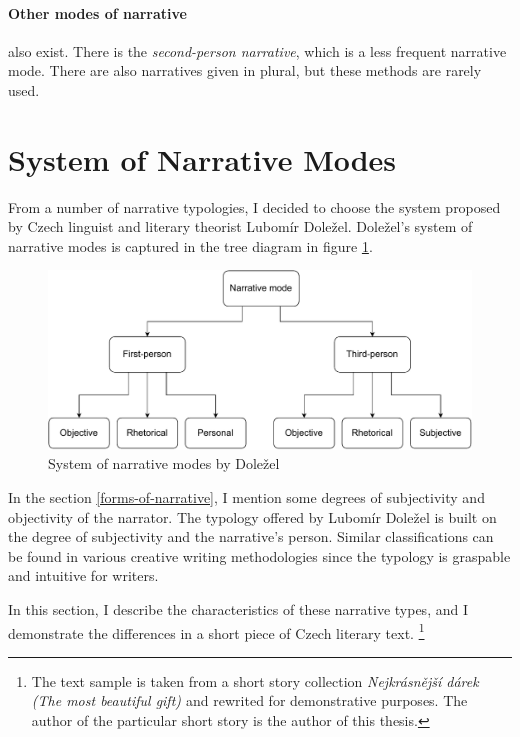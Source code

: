 \paragraph{Other modes of narrative} also exist. There is the \emph{second-person narrative}, which is a less frequent narrative mode. There are also narratives given in plural, but these methods are rarely used.

\section{System of Narrative Modes}

From a number of narrative typologies, I decided to choose the system proposed by Czech linguist and literary theorist Lubomír Doležel. Doležel's system of narrative modes is captured in the tree diagram in figure \ref{fig:schema-dolezel}.\cite{dolezel-narativni-zpusoby}

\begin{figure}[ht]
\includegraphics[width=1\textwidth]{data/dolezel-schema.pdf}
\caption{System of narrative modes by Doležel}
\label{fig:schema-dolezel}
\end{figure}

In the section \ref{forms-of-narrative}, I mention some degrees of subjectivity and objectivity of the narrator. The typology offered by Lubomír Doležel is built on the degree of subjectivity and the narrative's person. Similar classifications can be found in various creative writing methodologies \cite{docekalova} since the typology is graspable and intuitive for writers.

In this section, I describe the characteristics of these narrative types, and I demonstrate the differences in a short piece of Czech literary text. \footnote{The text sample is taken from a short story collection \emph{Nejkrásnější dárek (The most beautiful gift) \cite{nejkrasnejsi-darek}} and rewrited for demonstrative purposes. The author of the particular short story is the author of this thesis.}

